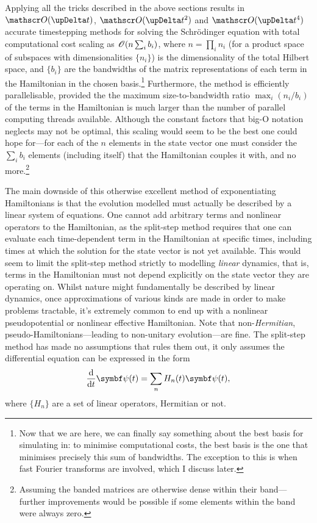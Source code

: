 Applying all the tricks described in the above sections results in $\Ord{\upDelta t}$, $\Ord{\upDelta t^2}$ and $\Ord{\upDelta t^4}$ accurate timestepping methods for solving the Schr\"odinger equation with total computational cost scaling as $\mathscr{O}(n \sum_i b_i)$, where $n=\prod_i n_i$ (for a product space of subspaces with dimensionalities $\{n_i\}$) is the dimensionality of the total Hilbert space, and $\{b_i\}$ are the bandwidths of the matrix representations of each term in the Hamiltonian in the chosen basis.\footnote{Now that we are here, we can finally say something about the best basis for simulating in: to minimise computational costs, the best basis is the one that minimises precisely this sum of bandwidths. The exception to this is when fast Fourier transforms are involved, which I discuss later.} Furthermore, the method is efficiently parallelisable, provided the the maximum size-to-bandwidth ratio $\max_i(n_i/b_i)$ of the terms in the Hamiltonian is much larger than the number of parallel computing threads available. Although the constant factors that big-O notation neglects may not be optimal, this scaling would seem to be the best one could hope for---for each of the $n$ elements in the state vector one must consider the $\sum_i b_i$ elements (including itself) that the Hamiltonian couples it with, and no more.\footnote{Assuming the banded matrices are otherwise dense within their band---further improvements would be possible if some elements within the band were always zero.}

The main downside of this otherwise excellent method of exponentiating Hamiltonians is that the evolution modelled must actually be described by a linear system of equations. One cannot add arbitrary terms and nonlinear operators to the Hamiltonian, as the split-step method requires that one can evaluate each time-dependent term in the Hamiltonian at specific times, including times at which the solution for the state vector is not yet available. This would seem to limit the split-step method strictly to modelling \emph{linear} dynamics, that is, terms in the Hamiltonian must not depend explicitly on the state vector they are operating on. Whilst nature might fundamentally be described by linear dynamics, once approximations of various kinds are made in order to make problems tractable, it's extremely common to end up with a nonlinear pseudopotential or nonlinear effective Hamiltonian. Note that non-\emph{Hermitian}, pseudo-Hamiltonians---leading to non-unitary evolution---are fine. The split-step method has made no assumptions that rules them out, it only assumes the differential equation can be expressed in the form
\begin{align}
\dv t \vec\psi(t) = \sum_n H_n(t)\vec\psi(t),
\end{align}
where $\{H_n\}$ are a set of linear operators, Hermitian or not.

